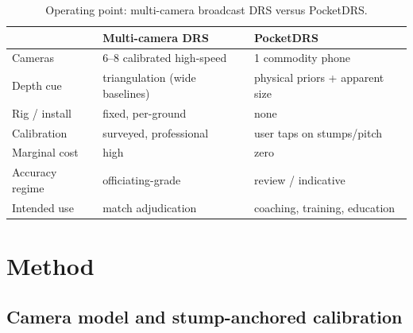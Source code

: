 \documentclass[journal]{IEEEtran}
\begin{document}
\begin{table}[!t]
\caption{Operating point: multi-camera broadcast DRS versus PocketDRS.}
\label{tab:compare}
\centering
\footnotesize
\renewcommand{\arraystretch}{1.3}
\setlength{\tabcolsep}{3.5pt}
\begin{tabular}{@{}p{2.5cm}p{2.4cm}p{2.6cm}@{}}
\toprule
& \textbf{Multi-camera DRS} & \textbf{PocketDRS}\\
\midrule
Cameras & 6--8 calibrated high-speed & 1 commodity phone\\
Depth cue & triangulation (wide baselines) & physical priors + apparent size\\
Rig / install & fixed, per-ground & none\\
Calibration & surveyed, professional & user taps on stumps/pitch\\
Marginal cost & high & zero\\
Accuracy regime & officiating-grade & review / indicative\\
Intended use & match adjudication & coaching, training, education\\
\bottomrule
\end{tabular}
\end{table}

\section{Method}
\label{sec:method}

\subsection{Camera model and stump-anchored calibration}
\label{sec:calib}
\end{document}

